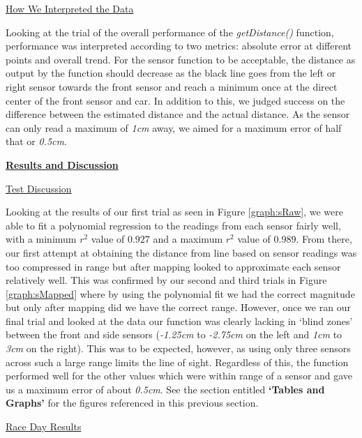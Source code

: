 \documentclass[twocolumn]{article}
\newcommand{\sectionTitle}[1]{ {\large\textbf{\uline{#1}}} \\ \vspace{1.5em} }
\newcommand{\subsectionTitle}[1]{ {\hspace{2em}\uline{#1}} \\ \vspace{1em} }
\begin{document}
\begin{flushleft}
		\subsectionTitle{How We Interpreted the Data}

		\hspace{1em}Looking at the trial of the overall performance of the \textit{getDistance()} function, performance was interpreted according to two metrics: absolute error at different points and overall trend. For the sensor function to be acceptable, the distance as output by the function should decrease as the black line goes from the left or right sensor towards the front sensor and reach a minimum once at the direct center of the front sensor and car. In addition to this, we judged success on the difference between the estimated distance and the actual distance. As the sensor can only read a maximum of \textit{1cm} away, we aimed for a maximum error of half that or \textit{0.5cm}. \\ \vspace{1em}

		\sectionTitle{Results and Discussion}
			
		\subsectionTitle{Test Discussion}

		\hspace{1em}Looking at the results of our first trial as seen in Figure \ref{graph:sRaw}, we were able to fit a polynomial regression to the readings from each sensor fairly well, with a minimum $r^2$ value of $0.927$ and a maximum $r^2$ value of $0.989$. From there, our first attempt at obtaining the distance from line based on sensor readings was too compressed in range but after mapping looked to approximate each sensor relatively well. This was confirmed by our second and third trials in Figure \ref{graph:sMapped} where by using the polynomial fit we had the correct magnitude but only after mapping did we have the correct range. However, once we ran our final trial and looked at the data our function was clearly lacking in `blind zones' between the front and side sensors (\textit{-1.25cm} to \textit{-2.75cm} on the left and \textit{1cm} to \textit{3cm} on the right). This was to be expected, however, as using only three sensors across such a large range limits the line of sight. Regardless of this, the function performed well for the other values which were within range of a sensor and gave us a maximum error of about \textit{0.5cm}. See the section entitled \textbf{`Tables and Graphs'} for the figures referenced in this previous section.\\ \vspace{4em}
		
		\subsectionTitle{Race Day Results}


\end{flushleft}
\end{document}
